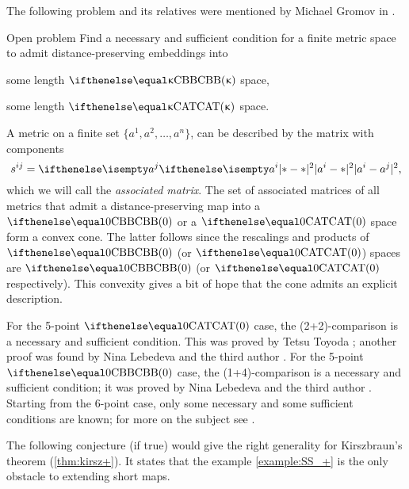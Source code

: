 The following problem and its relatives were mentioned by Michael Gromov in \cite[1.19]{gromov-MS}.

\begin{thm}{Open problem}\label{open:n-point-CBB}
Find a necessary and sufficient condition for a finite metric space to admit distance-preserving embeddings into 

\begin{subthm}{}
some length $\Alex{\kappa}$ space,
\end{subthm}

\begin{subthm}{}
some length $\CAT{\kappa}$ space.
\end{subthm}

\end{thm}

A metric on a finite set $\{a^1,a^2,\dots,a^n\}$,
can be described by the matrix with components
\[s^{ij}
=
\dist[2]{a^i}{a^j}{},\]
which we will call the \emph{associated matrix}.
The set of associated matrices of all metrics that admit a distance-preserving map into a $\Alex{0}$ or a $\CAT{0}$ space 
form a convex cone. 
The latter follows since the rescalings and products of $\Alex{0}$ (or $\CAT{0}$) spaces are  $\Alex{0}$ (or $\CAT{0}$ respectively).
This convexity gives a bit of hope that the cone admits an explicit description.

For the 5-point $\CAT{0}$ case, the (2+2)-comparison is a necessary and sufficient condition.
This was proved by Tetsu Toyoda \cite{toyoda};
another proof was found by Nina Lebedeva and the third author \cite{lebedeva-petrunin:toyoda}.
For the 5-point $\Alex{0}$ case, the (1+4)-comparison is a necessary and sufficient condition;
it was proved by Nina Lebedeva and the third author \cite{lebedeva-petrunin:5CBB}.
Starting from the 6-point case, only some necessary and some sufficient conditions are known;
for more on the subject see \cite{alexander-kapovitch-kirszbraun, lebedeva-petrunin:toyoda, lebedeva-petrunin-zolotov}.

The following conjecture (if true) would give the right generality for Kirszbraun's theorem (\ref{thm:kirsz+}).
It states that the example \ref{example:SS_+} 
is the only obstacle to extending short maps.

